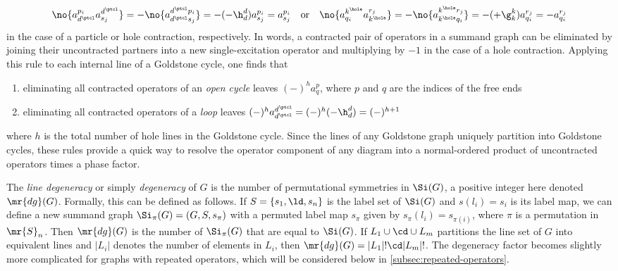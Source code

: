 \documentclass[11pt,fleqn]{article}
\numberwithin{equation}{section}
\begin{document}
\begin{drv}
\begin{align*}
  \no{a^{p_i}_{d^\ptcl}a^{d^\ptcl}_{s_j}}
=
-
  \no{a^{d^\ptcl p_i}_{d^\ptcl s_j}}
=
-
  (-\h^d_d)
  a^{p_i}_{s_j}
=
  a^{p_i}_{s_j}
&&
  \text{or}
&&
  \no{a^{k^\hole}_{q_i}a^{r_j}_{k^\hole}}
=
-
  \no{a^{k^\hole r_j}_{k^\hole q_i}}
=
-
  (+\g^k_k)
  a^{r_j}_{q_i}
=
-
  a^{r_j}_{q_i}
\end{align*}
in the case of a particle or hole contraction, respectively.
In words, a contracted pair of operators in a summand graph can be eliminated by joining their uncontracted partners into a new single-excitation operator and multiplying by $-1$ in the case of a hole contraction.
Applying this rule to each internal line of a Goldstone cycle, one finds that
\begin{enumerate}
\item
  eliminating all contracted operators of an \textit{open cycle} leaves $(-)^h a^p_q$, where $p$ and $q$ are the indices of the free ends
\item
  eliminating all contracted operators of a \textit{loop} leaves $(-)^h a^{d^\ptcl}_{d^\ptcl}=(-)^h(-\h^d_d)=(-)^{h+1}$
\end{enumerate}
where $h$ is the total number of hole lines in the Goldstone cycle.
Since the lines of any Goldstone graph uniquely partition into Goldstone cycles, these rules provide a quick way to resolve the operator component of any diagram into a normal-ordered product of uncontracted operators times a phase factor.
\end{drv}

\begin{cor}
\end{cor}

\begin{dfn}
The \textit{line degeneracy} or simply \textit{degeneracy} of $G$ is the number of permutational symmetries in $\Si(G)$, a positive integer here denoted $\mr{dg}(G)$.
Formally, this can be defined as follows.
If $S=\{s_1,\ld,s_n\}$ is the label set of $\Si(G)$ and $s(l_i)=s_i$ is its label map, we can define a new summand graph $\Si_{\pi}(G)=(G, S, s_{\pi})$ with a permuted label map $s_\pi$ given by $s_{\pi}(l_i)=s_{\pi(i)}$, where $\pi$ is a permutation in $\mr{S}_n$.
Then $\mr{dg}(G)$ is the number of $\Si_{\pi}(G)$ that are equal to $\Si(G)$.
If $L_1\cup\cd\cup L_{m}$ partitions the line set of $G$ into equivalent lines and $|L_i|$ denotes the number of elements in $L_i$, then $\mr{dg}(G)=|L_1|!\cd|L_{m}|!$.
The degeneracy factor becomes slightly more complicated for graphs with repeated operators, which will be considered below in \cref{subsec:repeated-operators}.
\end{dfn}
\end{document}

